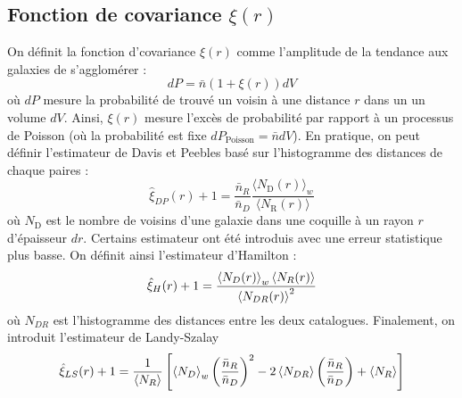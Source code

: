 \documentclass{article}
\numberwithin{equation}{section}
\begin{document}
\subsection{Fonction de covariance $\xi(r)$}

On définit la fonction d'covariance $\xi(r)$ comme l'amplitude de la tendance 
aux galaxies de s'agglomérer \cite{Peebles1980}:
\[
        dP = \bar{n} (1 + \xi(r)) dV
\]
où $dP$ mesure la probabilité de trouvé un voisin à une distance $r$ dans un un volume $dV$. 
Ainsi, $\xi(r)$ mesure l'excès de probabilité par rapport à un processus de Poisson (où 
la probabilité est fixe $dP_{\text{Poisson}} = \bar{n}dV$). En pratique, on peut définir 
l'estimateur de Davis et Peebles basé sur l'histogramme des distances de chaque paires \cite{Davis1983}:
\begin{equation}\label{eq:DavisPeebles} 
        \hat{\xi}_{DP}(r) + 1 = \frac{\bar{n}_R}{\bar{n}_D}\frac{\langle N_{\text{D}}(r) \rangle_w}{
        \langle N_{\text{R}}(r) \rangle}
\end{equation} 
où $N_{\text{D}}$ est le nombre de voisins d'une galaxie dans une coquille à un rayon $r$ 
d'épaisseur $dr$. Certains estimateur ont été introduis avec une erreur statistique plus 
basse. On définit ainsi l'estimateur d'Hamilton \cite{Hamilton1983}:
\begin{equation}\label{eq:Hamilton} 
        \hat{\xi}_H(r) + 1 =  \frac{\expval{N_D(r)}_w \expval{N_R(r)}}{\expval{N_{DR}(r)}^2}
\end{equation} 
où $N_{DR}$ est l'histogramme des distances entre les deux catalogues. Finalement, 
on introduit l'estimateur de Landy-Szalay \cite{Landy1993}
\begin{equation}\label{eq:Landy} 
        \hat{\xi}_{LS}(r) + 1 = \frac{1}{\expval{N_R}} \left[ 
                \expval{N_D}_w \left( \frac{\bar{n}_R}{\bar{n}_D} \right)^{2}
                - 2 \expval{N_{DR}} \left( \frac{\bar{n}_R}{\bar{n}_D} \right)
                + \expval{N_R}
        \right] 
\end{equation} 
\end{document}
